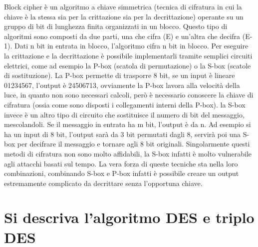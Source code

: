 Block cipher è un algoritmo a chiave simmetrica (tecnica di cifratura in cui la chiave è la stessa sia per la crittazione sia per la decrittazione) operante su un gruppo di bit di lunghezza finita organizzati in un blocco.
Questo tipo di algoritmi sono composti da due parti, una che cifra (E) e un’altra che decifra (E-1).
Dati n bit in entrata in blocco, l’algoritmo cifra n bit in blocco.
Per eseguire la crittazione e la decrittazione è possibile implementarli tramite semplici circuiti elettrici, come ad esempio la P-box (scatola di permutazione) o la S-box (scatole di sostituzione).
La P-box permette di trasporre 8 bit, se un input è lineare 01234567, l’output è 24506713, ovviamente la P-box lavora alla velocità della luce, in quanto non sono necessari calcoli, però è necessario conoscere la chiave di cifratura (ossia come sono disposti i collegamenti interni della P-box).
la S-box invece è un altro tipo di circuito che sostituisce il numero di bit del messaggio, mescolandoli.
Se il messaggio in entrata ha m bit, l’output è da n. Ad esempio si ha un input di 8 bit, l’output sarà da 3 bit permutati dagli 8, servirà poi una S-box per decifrare il messaggio e tornare agli 8 bit originali. 
Singolarmente questi metodi di cifratura non sono molto affidabili, la S-box infatti è molto vulnerabile agli attacchi basati sul tempo.
La vera forza di queste tecniche sta nella loro combinazioni, combinando S-box e P-box infatti è possibile creare un output estremamente complicato da decrittare senza l’opportuna chiave. 
 

\section{Si descriva l’algoritmo DES e triplo DES}

